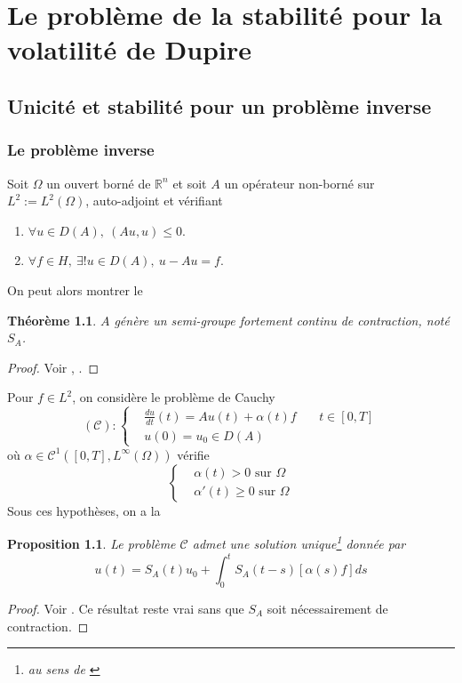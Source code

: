 \documentclass[a4paper]{book}
\newtheorem{thm}{Théorème}[chapter]
\newtheorem{prop}{Proposition}[chapter]
\begin{document}
\part{Le problème de la stabilité pour la volatilité de Dupire}



\chapter{Unicité et stabilité pour un problème inverse}
\section{Le problème inverse}
Soit $\Omega$ un ouvert borné de $\mathbb{R}^n$ et soit $A$ un opérateur non-borné sur $L^2:=L^2(\Omega)$, auto-adjoint et vérifiant
\begin{enumerate}
    \item $\forall u\in D(A),\ (Au,u)\leq0$.
          \item$\forall f\in H,\ \exists ! u\in D(A),\ u-Au=f$.
\end{enumerate}
On peut alors montrer le
\begin{thm}
    $A$ génère un semi-groupe fortement continu de contraction, noté $S_A$.
\end{thm}
\begin{proof}
    Voir \cite{HB}, \cite{Pazy}.
\end{proof}

Pour $f\in L^2$, on considère le problème de Cauchy
\[(\mathcal{C}):\left\lbrace\begin{aligned}
         & \frac{du}{dt}(t)=A u(t)+\alpha(t)f & \  & t\in[0,T] \\
         & u(0)=u_0 \in D(A)
    \end{aligned}\right. \]
où $\alpha\in\mathcal{C}^1([0,T],L^\infty(\Omega))$ vérifie
\[\left\lbrace\begin{aligned}
         & \alpha(t)>0 \text{ sur } \Omega      \\
         & \alpha'(t)\geq 0 \text{ sur } \Omega
    \end{aligned}\right. \]
Sous ces hypothèses, on a la
\begin{prop}
    Le problème $\mathcal{C}$ admet une solution unique\footnote{au sens de \cite{Pazy}} donnée par
    \begin{equation}
        u(t)=S_A(t)u_0 +\int_{0}^{t}S_A(t-s)[\alpha(s)f]ds
    \end{equation}
\end{prop}
\begin{proof}
    Voir \cite{Pazy}. Ce résultat reste vrai sans que $S_A$ soit nécessairement de contraction.
\end{proof}
\end{document}
